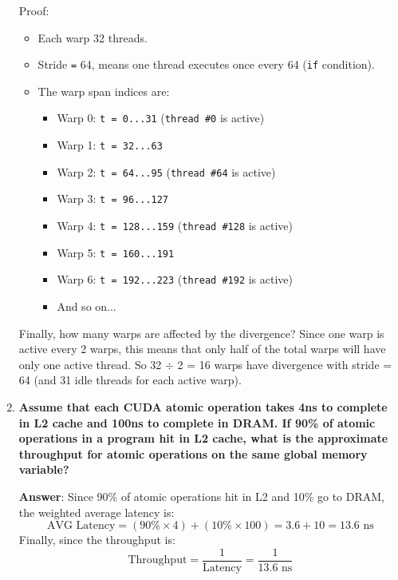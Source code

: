 \begin{enumerate}[label=\Alph*.]
    Proof:
    \begin{itemize}
        \item Each warp 32 threads.
        \item Stride \texttt{=} 64, means one thread executes once every 64 (\texttt{if} condition).
        \item The warp span indices are:
        \begin{itemize}
            \item Warp 0: \texttt{t = 0...31} (\texttt{thread \#0} is active)
            \item Warp 1: \texttt{t = 32...63}
            \item Warp 2: \texttt{t = 64...95} (\texttt{thread \#64} is active)
            \item Warp 3: \texttt{t = 96...127}
            \item Warp 4: \texttt{t = 128...159} (\texttt{thread \#128} is active)
            \item Warp 5: \texttt{t = 160...191}
            \item Warp 6: \texttt{t = 192...223} (\texttt{thread \#192} is active)
            \item And so on...
        \end{itemize}
    \end{itemize}
    Finally, how many warps are affected by the divergence? Since one warp is active every 2 warps, this means that only half of the total warps will have only one active thread. So 32 $\div$ 2 = 16 warps have divergence with stride = 64 (and 31 idle threads for each active warp).

    \newpage

    \item \textcolor{Green3}{\textbf{%
        Assume that each CUDA atomic operation takes 4ns to complete in L2 cache and 100ns to complete in DRAM. If 90\% of atomic operations in a program hit in L2 cache, what is the approximate throughput for atomic operations on the same global memory variable?
    }}

    \textbf{Answer}: Since 90\% of atomic operations hit in L2 and 10\% go to DRAM, the weighted average latency is:
    \begin{equation*}
        \text{AVG Latency} = \left(90\% \times 4\right) + \left(10\% \times 100\right) = 3.6 + 10 = 13.6 \text{ ns}
    \end{equation*}
    Finally, since the throughput is:
    \begin{equation*}
        \text{Throughput} = \dfrac{1}{\text{Latency}} = \dfrac{1}{13.6 \text{ ns}}
    \end{equation*}


\end{enumerate}
